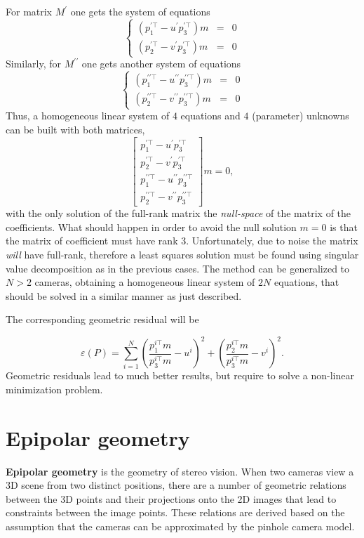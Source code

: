\documentclass[10pt]{report}
\begin{document}
For matrix \(M^\prime\) one gets the system of equations $$\left\{\begin{array}{ccc} (p^{\prime\top}_1 - u^\prime p^{\prime\top}_3)m & = & 0 \\ (p^{\prime\top}_2 - v^\prime p^{\prime\top}_3)m & = & 0\end{array}\right.$$
Similarly, for \(M^{\prime\prime}\) one gets another system of equations $$\left\{\begin{array}{ccc} (p^{\prime\prime\top}_1 - u^{\prime\prime} p^{\prime\prime\top}_3)m & = & 0 \\ (p^{\prime\prime\top}_2 - v^{\prime\prime} p^{\prime\prime\top}_3)m & = & 0\end{array}\right.$$ Thus, a homogeneous linear system of \(4\) equations and \(4\) (parameter) unknowns can be built with both matrices,
$$\begin{bmatrix} p^{\prime\top}_1 - u^{\prime} p^{\prime\top}_3 \\ p^{\prime\top}_2 - v^{\prime} p^{\prime\top}_3 \\ p^{\prime\prime\top}_1 - u^{\prime\prime} p^{\prime\prime\top}_3 \\ p^{\prime\prime\top}_2 - v^{\prime\prime} p^{\prime\prime\top}_3\end{bmatrix}m = 0,$$
with the only solution of the full\--rank matrix the \emph{null\--space} of the matrix of the coefficients. What should happen in order to avoid the null solution \(m=0\) is that the matrix of coefficient must have rank \(3\). Unfortunately, due to noise the matrix \emph{will} have full\--rank, therefore a least squares solution must be found using singular value decomposition as in the previous cases. The method can be generalized to \(N > 2\) cameras, obtaining a homogeneous linear system of \(2N\) equations, that should be solved in a similar manner as just described.

The corresponding geometric residual will be

$$ \varepsilon (P) = \sum_{i=1}^N \left(\frac{p_1^{i\top} m}{p_3^{i\top} m} -u^i \right)^2 +\left(\frac{p_2^{i\top} m}{p_3^{i\top} m} - v^i\right)^2.$$ Geometric residuals lead to much better results, but require to solve a non\--linear minimization problem.


\section{Epipolar geometry}
\label{sec:org2f55ebf}
\textbf{Epipolar geometry} is the geometry of stereo vision. When two cameras view a 3D scene from two distinct positions, there are a number of geometric relations between the 3D points and their projections onto the 2D images that lead to constraints between the image points. These relations are derived based on the assumption that the cameras can be approximated by the pinhole camera model.
\end{document}
